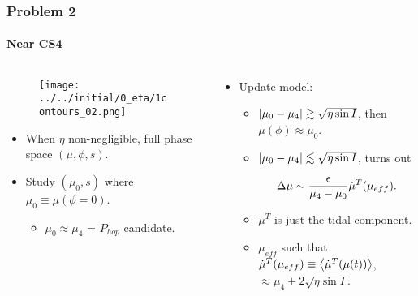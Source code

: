 \documentclass[dvipsnames, 11pt]{beamer}
\DeclarePairedDelimiter\abs{\lvert}{\rvert}
\DeclarePairedDelimiter\ev{\langle}{\rangle}
\DeclarePairedDelimiter\p{\lparen}{\rparen}
\begin{document}
\begin{frame}
    \frametitle{Problem 2}
    \framesubtitle{Near CS4}

    \begin{columns}
        \begin{column}{0.5\textwidth}
            \begin{figure}[t]
                \centering
                \texttt{[image: ../../initial/0\_eta/1contours\_02.png]}
            \end{figure}

            \begin{itemize}
                \item When $\eta$ non-negligible, full phase space $(\mu, \phi,
                    s)$.

                \item Study $(\mu_0, s)$ where $\mu_0 \equiv \mu(\phi = 0)$.
                    \begin{itemize}
                        \item $\mu_0 \approx \mu_4$ = $P_{hop}$ candidate.
                    \end{itemize}
            \end{itemize}
        \end{column}
        \begin{column}{0.5\textwidth}
            \begin{itemize}
                \item Update model:
                    \begin{itemize}
                        \item $\abs*{\mu_0 - \mu_4} \gtrsim \sqrt{\eta \sin I}$,
                            then $\mu(\phi) \approx \mu_0$.

                        \item $\abs*{\mu_0 - \mu_4} \lesssim
                            \sqrt{\eta \sin I}$, turns out

                            \begin{equation}
                                \Delta \mu \sim
                                    \frac{\epsilon}{\mu_4 - \mu_0}
                                        \dot{\mu}^{T}\p*{\mu_{eff}}.
                            \end{equation}

                        \item $\dot{\mu}^{T}$ is just the tidal component.

                        \item $\mu_{eff}$ such that $\dot{\mu}^{T}(\mu_{eff})
                            \equiv \ev*{\dot{\mu}^{T}(\mu(t))}$, $\approx \mu_4
                            \pm 2\sqrt{\eta \sin I}$.
                    \end{itemize}
            \end{itemize}
        \end{column}
    \end{columns}
\end{frame}
\end{document}
